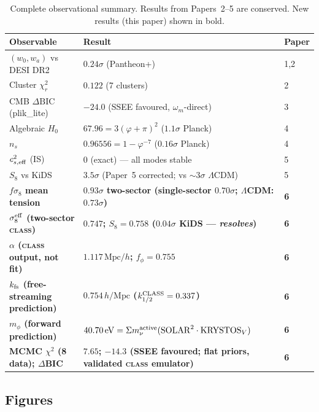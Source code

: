 \documentclass[12pt,a4paper]{article}
\newcommand{\kfs}{k_{\rm fs}}
\newcommand{\mnu}{\Sigma m_\nu}
\newcommand{\fsig}{f\sigma_8}
\newcommand{\sigeff}{\sigma_8^{\rm eff}}
\begin{document}
\begin{table}[htbp]
  \centering
  \caption{Complete observational summary. Results from Papers~2--5 are conserved.
    New results (this paper) shown in bold.}
  \label{tab:summary}
  \begin{tabularx}{\textwidth}{l X X}
    \toprule
    Observable & Result & Paper \\
    \midrule
    $(w_0, w_a)$ vs DESI DR2 & $0.24\sigma$ (Pantheon+) & 1,2 \\
    Cluster $\chi^2_r$ & $0.122$ (7 clusters) & 2 \\
    CMB $\Delta\mathrm{BIC}$ (plik\_lite) & $-24.0$ (SSEE favoured, $\omega_m$-direct) & 3 \\
    Algebraic $H_0$ & $67.96 = 3(\varphi+\pi)^2$ ($1.1\sigma$ Planck) & 4 \\
    $n_s$ & $0.96556 = 1 - \varphi^{-7}$ ($0.16\sigma$ Planck) & 4 \\
    $c^2_{s,\rm eff}$ (IS) & $0$ (exact) — all modes stable & 5 \\
    $S_8$ vs KiDS & $3.5\sigma$ (Paper~5 corrected; vs $\sim3\sigma$ $\Lambda$CDM) & 5 \\
    \midrule
    \textbf{$\fsig$ mean tension} & \textbf{$0.93\sigma$ two-sector (single-sector $0.70\sigma$; $\Lambda$CDM: $0.73\sigma$)} & \textbf{6} \\
    \textbf{$\sigeff$ (two-sector \textsc{class})} & \textbf{$0.747$; $S_8=0.758$ ($0.04\sigma$ KiDS --- \emph{resolves})} & \textbf{6} \\
    \textbf{$\alpha$ (\textsc{class} output, not fit)} & \textbf{$1.117\,\mathrm{Mpc}/h$; $f_\phi=0.755$} & \textbf{6} \\
    \textbf{$\kfs$ (free-streaming prediction)} & \textbf{$0.754\,h/\mathrm{Mpc}$ ($k_{1/2}^{\rm CLASS}=0.337$)} & \textbf{6} \\
    \textbf{$m_\phi$ (forward prediction)} & \textbf{$40.70\,\mathrm{eV} = \mnu^{\rm active}(\mathrm{SOLAR}^2\cdot\mathrm{KRYSTOS}_V)$} & \textbf{6} \\
    \textbf{MCMC $\chi^2$ (8 data); $\Delta$BIC} & \textbf{$7.65$; $-14.3$ (SSEE favoured; flat priors, validated \textsc{class} emulator)} & \textbf{6} \\
    \bottomrule
  \end{tabularx}
\end{table}

\subsection{Figures}
\label{subsec:figures}
\end{document}
